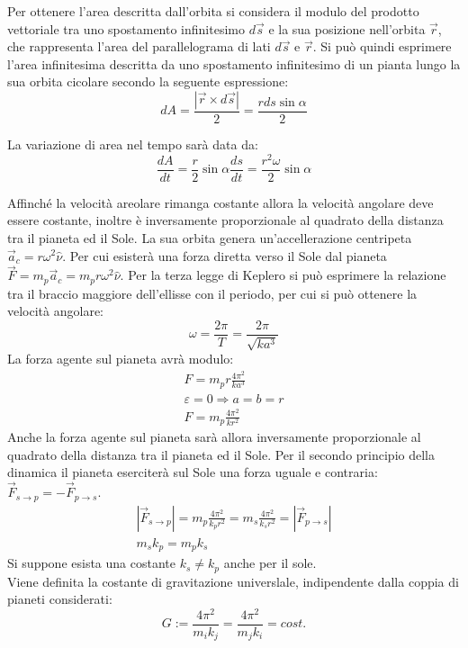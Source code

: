 \documentclass{article}
\numberwithin{equation}{subsection}
\begin{document}
Per ottenere l'area descritta dall'orbita si considera il modulo del prodotto vettoriale tra uno spostamento infinitesimo $d\vec{s}$ e la sua posizione nell'orbita $\vec{r}$, 
che rappresenta l'area del parallelograma di lati $d\vec{s}$ e $\vec{r}$. Si può quindi esprimere l'area infinitesima descritta da uno spostamento infinitesimo di un 
pianta lungo la sua orbita cicolare secondo la seguente espressione: 
\begin{equation*}
    dA=\displaystyle\frac{|\vec{r}\times d\vec{s}|}{2}=\frac{rds\sin\alpha}{2}
\end{equation*}

La variazione di area nel tempo sarà data da:
\begin{equation*}
    \displaystyle\frac{dA}{dt}=\frac{r}{2}\sin\alpha\frac{d{s}}{dt}=\frac{r^2\omega}{2}\sin\alpha
\end{equation*}

Affinché la velocità areolare rimanga costante allora la velocità angolare deve essere costante, inoltre è inversamente proporzionale al quadrato della distanza 
tra il pianeta ed il Sole. La sua orbita genera un'accellerazione centripeta $\vec{a}_c=r\omega^2\hat{\nu}$. Per cui esisterà una forza diretta verso 
il Sole dal pianeta $\vec{F}=m_p\vec{a}_c=m_pr\omega^2\hat{\nu}$. Per la terza legge di Keplero si può esprimere la relazione tra il braccio maggiore
dell'ellisse con il periodo, per cui si può ottenere la velocità angolare: 
\begin{equation*}
    \omega=\displaystyle\frac{2\pi}{T}=\frac{2\pi}{\sqrt{ka^3}}
\end{equation*}
La forza agente sul pianeta avrà modulo:
\begin{gather*}
    F=m_pr\displaystyle\frac{4\pi^2}{ka^3}\\
    \varepsilon=0\Rightarrow a=b=r\\
    F=m_p\displaystyle\frac{4\pi^2}{kr^2}
\end{gather*}
Anche la forza agente sul pianeta sarà allora inversamente proporzionale al quadrato della distanza tra il pianeta ed il Sole. Per il secondo 
principio della dinamica il pianeta eserciterà sul Sole una forza uguale e contraria: $\vec{F}_{s\to p}=-\vec{F}_{p\to s}$. 
\begin{gather*}
    \left|\vec{F}_{s\to p}\right|=m_p\displaystyle\frac{4\pi^2}{k_pr^2}=m_s\displaystyle\frac{4\pi^2}{k_sr^2}=\left|\vec{F}_{p\to s}\right|\\
    m_sk_p=m_pk_s
\end{gather*}
Si suppone esista una costante $k_s\neq k_p$ anche per il sole. 
\\
Viene definita la costante di gravitazione universlale, indipendente dalla coppia di pianeti considerati:
\begin{equation}
    G:=\displaystyle\frac{4\pi^2}{m_ik_j}=\frac{4\pi^2}{m_jk_i}=cost.
\end{equation}
\end{document}
